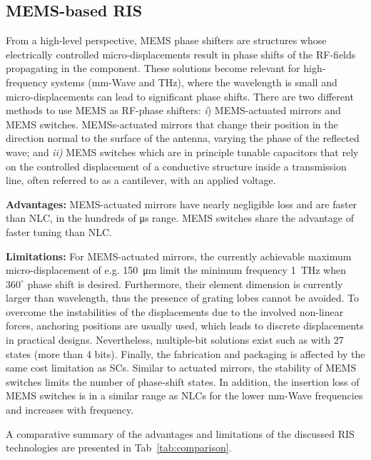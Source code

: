 \subsection{MEMS-based \gls{RIS}}

From a high-level perspective, \gls{MEMS} phase shifters are structures whose electrically controlled micro-displacements result in phase shifts of the \gls{RF}-fields propagating in the component. These solutions become relevant for high-frequency systems (\gls{mm-Wave} and THz), where the wavelength is small and micro-displacements can lead to significant phase shifts. There are two different methods to use \gls{MEMS} as \gls{RF}-phase shifters: \textit{i})
\gls{MEMS}-actuated mirrors and \gls{MEMS} switches. \glspl{MEMS}-actuated mirrors that change their position in the direction normal to the surface of the antenna, varying the phase of the reflected wave; and \textit{ii)} \gls{MEMS} switches which are in principle  tunable capacitors that rely on the controlled displacement of a conductive structure inside a transmission line, often referred to as a cantilever, with an applied voltage.

\textbf{Advantages:} \gls{MEMS}-actuated mirrors have nearly negligible loss and are faster than \gls{NLC}, in the hundreds of \si{\micro\second} range. \gls{MEMS} switches share the advantage of faster tuning than \gls{NLC}. 



\textbf{Limitations:} For \gls{MEMS}-actuated mirrors, the currently achievable maximum micro-displacement of e.g. \SI{150}{\micro\meter} limit the minimum frequency \SI{1}{\tera\hertz} when $360^\circ$ phase shift is desired. 
Furthermore, their element dimension is currently larger than wavelength, thus the presence of grating lobes cannot be avoided.
To overcome the instabilities of the displacements due to the involved non-linear forces, anchoring positions are usually used, which leads to discrete displacements in practical designs.
Nevertheless, multiple-bit solutions exist such as \cite{schmitt20213} with 27 states (more than 4 bits). Finally, the fabrication and packaging is affected by the same cost limitation as \glspl{SC}. 
Similar to actuated mirrors, the stability of \gls{MEMS} switches limits the number of phase-shift states. In addition, the insertion loss of \gls{MEMS} switches is in a similar range as \glspl{NLC} for the lower \gls{mm-Wave} frequencies and increases with frequency.

A comparative summary of the advantages and limitations of the discussed \gls{RIS} technologies are presented in Tab~\ref{tab:comparison}.

